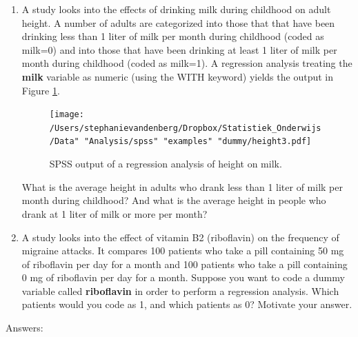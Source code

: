 \documentclass[]{book}\usepackage[]{graphicx}\usepackage[]{color}
\begin{document}
\begin{enumerate}
\item A study looks into the effects of drinking milk during childhood on adult height. A number of adults are categorized into those that that have been drinking less than 1 liter of milk per month during childhood (coded as milk=0) and into those that have been drinking at least 1 liter of milk per month during childhood (coded as milk=1). A regression analysis treating the \textbf{milk} variable as numeric (using the WITH keyword) yields the output in Figure \ref{fig:dummy_14}.

\begin{figure}[h]
    \begin{center}
       \texttt{[image: /Users/stephanievandenberg/Dropbox/Statistiek\_Onderwijs/Data" "Analysis/spss" "examples" "dummy/height3.pdf]}
    \end{center}
 \caption{SPSS output of a regression analysis of height on milk.}
 \label{fig:dummy_14}
\end{figure}

What is the average height in adults who drank less than 1 liter of milk per month during childhood? And what is the average height in people who drank at 1 liter of milk or more per month?


\item A study looks into the effect of vitamin B2 (riboflavin) on the frequency of migraine attacks. It compares 100 patients who take a pill containing 50 mg of riboflavin per day for a month and 100 patients who take a pill containing 0 mg of riboflavin per day for a month. Suppose you want to code a dummy variable called \textbf{riboflavin} in order to perform a regression analysis. Which patients would you code as 1, and which patients as 0? Motivate your answer. 

\end{enumerate}

Answers:
\end{document}
